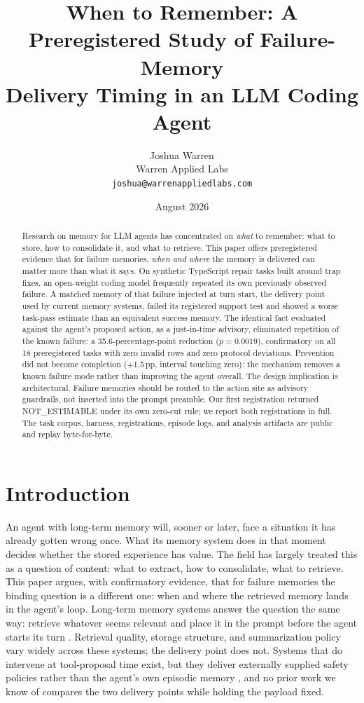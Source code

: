 \documentclass[11pt]{article}
\title{When to Remember: A Preregistered Study of Failure-Memory\\Delivery Timing in an LLM Coding Agent}
\author{Joshua Warren\\Warren Applied Labs\\\texttt{joshua@warrenappliedlabs.com}}
\date{August 2026}
\newcommand{\pp}{\ensuremath{\,\mathrm{pp}}}
\begin{document}
\maketitle

\begin{abstract}
Research on memory for LLM agents has concentrated on \emph{what} to
remember: what to store, how to consolidate it, and what to retrieve.
This paper offers preregistered evidence that for failure memories,
\emph{when and where} the memory is delivered can matter more than what it
says. On synthetic TypeScript repair tasks built around trap fixes, an
open-weight coding model frequently repeated its own previously observed
failure. A matched memory of that failure injected at turn start, the
delivery point used by current memory systems, failed its registered
support test and showed a worse task-pass estimate than an equivalent
success memory. The identical fact evaluated against the agent's proposed
action, as a just-in-time advisory, eliminated repetition of the known
failure: a 35.6-percentage-point reduction ($p = 0.0019$), confirmatory on
all 18 preregistered tasks with zero invalid rows and zero protocol
deviations. Prevention did not become completion (+1.5\pp{}, interval
touching zero): the mechanism removes a known failure mode rather than
improving the agent overall. The design implication is architectural.
Failure memories should be routed to the action site as advisory
guardrails, not inserted into the prompt preamble. Our first registration
returned NOT\_ESTIMABLE under its own zero-cut rule; we report both
registrations in full. The task corpus, harness, registrations, episode
logs, and analysis artifacts are public and replay byte-for-byte.
\end{abstract}

\section{Introduction}
\label{sec:intro}

An agent with long-term memory will, sooner or later, face a situation it has
already gotten wrong once. What its memory system does in that moment decides
whether the stored experience has value. The field has largely treated this
as a question of content: what to extract, how to consolidate, what to
retrieve. This paper argues, with confirmatory evidence, that for failure
memories the binding question is a different one: when and where the
retrieved memory lands in the agent's loop. Long-term memory systems answer
the question the same way: retrieve whatever seems relevant and place it in
the prompt before the agent starts its turn
\citep{packer2023memgpt, chhikara2025mem0, xu2025amem, zhao2023expel}.
Retrieval quality, storage structure, and summarization policy vary widely
across these systems; the delivery point does not. Systems that do intervene
at tool-proposal time exist, but they deliver externally supplied safety
policies rather than the agent's own episodic memory
\citep{xiang2024guardagent, ruan2023toolemu}, and no prior work we know of
compares the two delivery points while holding the payload fixed.
\end{document}
